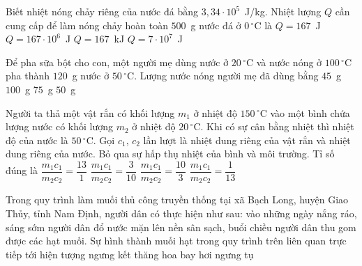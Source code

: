 	\begin{ex}%
		Biết nhiệt nóng chảy riêng của nước đá bằng $3{,}34\cdot 10^5$~J/kg. Nhiệt lượng $Q$ cần cung cấp để làm nóng chảy hoàn toàn $500$~g nước đá ở $0\,^\circ\text{C}$ là
		\choice
		{$Q=167$~J}
		{$Q=167\cdot 10^6$~J}
		{\True $Q=167$~kJ}
		{$Q=7\cdot 10^7$~J}
	\end{ex}

	\begin{ex}%
		Để pha sữa bột cho con, một người mẹ dùng nước ở $20\,^\circ\text{C}$ và nước nóng ở $100\,^\circ\text{C}$ pha thành $120$~g nước ở $50\,^\circ\text{C}$. Lượng nước nóng người mẹ đã dùng bằng
		\choice
		{\True $45$~g}
		{$100$~g}
		{$75$~g}
		{$50$~g}
	\end{ex}

	\begin{ex}%
		Người ta thả một vật rắn có khối lượng $m_1$ ở nhiệt độ $150\,^\circ\text{C}$ vào một bình chứa lượng nước có khối lượng $m_2$ ở nhiệt độ $20\,^\circ\text{C}$. Khi có sự cân bằng nhiệt thì nhiệt độ của nước là $50\,^\circ\text{C}$. Gọi $c_1$, $c_2$ lần lượt là nhiệt dung riêng của vật rắn và nhiệt dung riêng của nước. Bỏ qua sự hấp thụ nhiệt của bình và môi trường. Tỉ số đúng là
		\choice
		{$\dfrac{m_1c_1}{m_2c_2}=\dfrac{13}{1}$}
		{\True $\dfrac{m_1c_1}{m_2c_2}=\dfrac{3}{10}$}
		{$\dfrac{m_1c_1}{m_2c_2}=\dfrac{10}{3}$}
		{$\dfrac{m_1c_1}{m_2c_2}=\dfrac{1}{13}$}
	\end{ex}

	\begin{ex}%
		Trong quy trình làm muối thủ công truyền thống tại xã Bạch Long, huyện Giao Thủy, tỉnh Nam Định, người dân có thực hiện như sau: vào những ngày nắng ráo, sáng sớm người dân đổ nước mặn lên nền sân sạch, buổi chiều người dân thu gom được các hạt muối. Sự hình thành muối hạt trong quy trình trên liên quan trực tiếp tới hiện tượng
		\choice
		{ngưng kết}
		{thăng hoa}
		{\True bay hơi}
		{ngưng tụ}
	\end{ex}

